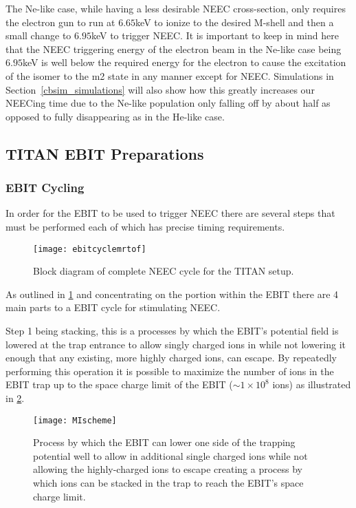 \documentclass[jon_ringuette_thesis_proposal.tex]{subfiles}
\begin{document}
    The Ne-like case, while having a less desirable NEEC cross-section, only requires the electron gun to run at $6.65$keV to ionize to the desired M-shell and then a small change to $6.95$keV to trigger NEEC.
    It is important to keep in mind here that the NEEC triggering energy of the electron beam in the Ne-like case being $6.95$keV is well below the required energy for the electron to cause the excitation of the isomer to the m2 state in any manner except for NEEC.
    Simulations in Section~\ref{cbsim_simulations} will also show how this greatly increases our NEECing time due to the Ne-like population only falling off by about half as opposed to fully disappearing as in the He-like case.

    \subsection{TITAN EBIT Preparations}

    \subsubsection{EBIT Cycling}
    In order for the EBIT to be used to trigger NEEC there are several steps that must be performed each of which has precise timing requirements.

    \begin{figure}[H]
        \begin{center}
            \texttt{[image: ebitcyclemrtof]}
        \end{center}
        \caption{\small Block diagram of complete NEEC cycle for the TITAN setup.}
        \label{fig:ebit_cycle_mrtof}
    \end{figure}

    As outlined in \ref{fig:ebit_cycle_mrtof} and concentrating on the portion within the EBIT there are 4 main parts to a EBIT cycle for stimulating NEEC.

    Step 1 being stacking, this is a processes by which the EBIT's potential field is lowered at the trap entrance to allow singly charged ions in while not lowering it enough that any existing, more highly charged ions, can escape.
    By repeatedly performing this operation it is possible to maximize the number of ions in the EBIT trap up to the space charge limit of the EBIT ($\sim 1\times 10^8$ ions) as illustrated in \ref{fig:ebit_stacking}.

    \begin{figure}[H]
        \begin{center}
            \texttt{[image: MIscheme]}
        \end{center}
        \caption{\small Process by which the EBIT can lower one side of the trapping potential well to allow in additional single charged ions while not allowing the highly-charged ions to escape creating a process by which ions can be stacked in the trap to reach the EBIT's space charge limit. \cite{Multi_reflec} \cite{Ebit_klawitter}}
        \label{fig:ebit_stacking}
    \end{figure}
\end{document}
